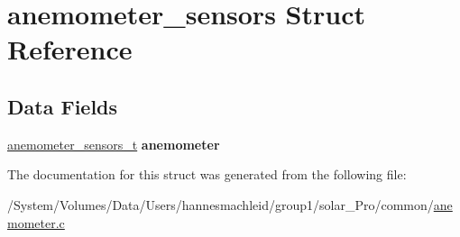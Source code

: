 \hypertarget{structanemometer__sensors}{}\section{anemometer\+\_\+sensors Struct Reference}
\label{structanemometer__sensors}
\subsection*{Data Fields}
\begin{DoxyCompactItemize}
\item 
\mbox{\label{structanemometer__sensors_a31e8151a0ecb9797a8223c2cfde179c6}} 
\mbox{\hyperlink{structanemometer__sensors__t}{anemometer\+\_\+sensors\+\_\+t}} {\bfseries anemometer}
\end{DoxyCompactItemize}


The documentation for this struct was generated from the following file\+:\begin{DoxyCompactItemize}
\item 
/\+System/\+Volumes/\+Data/\+Users/hannesmachleid/group1/solar\+\_\+\+Pro/common/\mbox{\hyperlink{anemometer_8c}{anemometer.\+c}}\end{DoxyCompactItemize}
